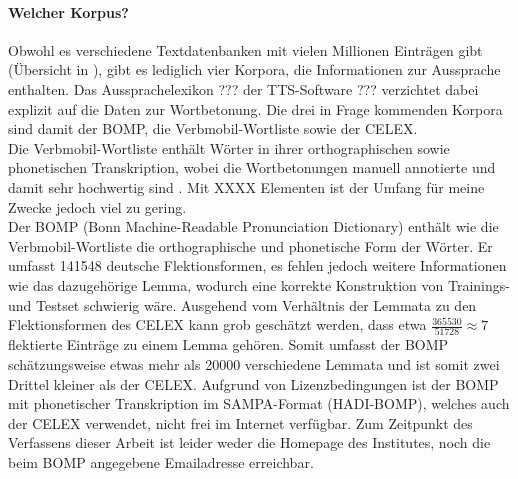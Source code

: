 \paragraph*{Welcher Korpus?}
Obwohl es verschiedene Textdatenbanken mit vielen Millionen Einträgen gibt (Übersicht in \cite{Duffner&Naf2006}), gibt es lediglich vier Korpora, die Informationen zur Aussprache enthalten. Das Aussprachelexikon ??? \cite{???} der TTS-Software ??? verzichtet dabei explizit auf die Daten zur Wortbetonung. Die drei in Frage kommenden Korpora sind damit der BOMP, die Verbmobil-Wortliste sowie der CELEX.
\\
Die Verbmobil-Wortliste \cite{Lungen&Ehlebracht1998} enthält Wörter in ihrer orthographischen sowie phonetischen Transkription, wobei die Wortbetonungen manuell annotierte und damit sehr hochwertig sind \cite[S.~1]{Wagner2001}. Mit XXXX Elementen ist der Umfang für meine Zwecke jedoch viel zu gering.
\\
Der BOMP (Bonn Machine-Readable Pronunciation Dictionary) \cite{BOMP} enthält wie die Verbmobil-Wortliste die orthographische und phonetische Form der Wörter. Er umfasst 141548 deutsche Flektionsformen, es fehlen jedoch weitere Informationen wie das dazugehörige Lemma, wodurch eine korrekte Konstruktion von Trainings- und Testset schwierig wäre. Ausgehend vom Verhältnis der Lemmata zu den Flektionsformen des CELEX kann grob geschätzt werden, dass etwa $\frac{365530}{51728} \approx 7$ flektierte Einträge zu einem Lemma gehören. Somit umfasst der BOMP schätzungsweise etwas mehr als 20000 verschiedene Lemmata und ist somit zwei Drittel kleiner als der CELEX. Aufgrund von Lizenzbedingungen ist der BOMP mit phonetischer Transkription im SAMPA-Format (HADI-BOMP), welches auch der CELEX verwendet, nicht frei im Internet verfügbar. Zum Zeitpunkt des Verfassens dieser Arbeit ist leider weder die Homepage des Institutes, noch die beim BOMP angegebene Emailadresse erreichbar.
\\
